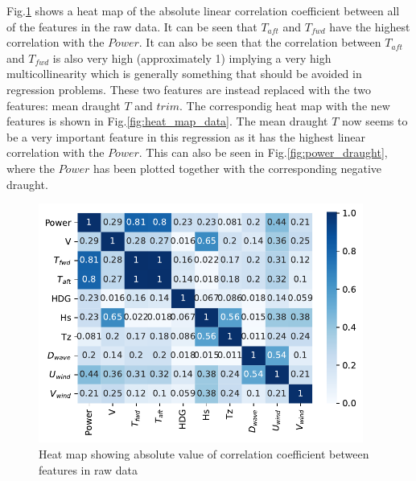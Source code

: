 Fig.\ref{fig:heat_map_raw_data} shows a heat map of the absolute
linear correlation coefficient between all of the features in the raw
data. It can be seen that $T_{aft}$ and $T_{fwd}$ have the highest
correlation with the $Power$. It can also be seen that the correlation
between $T_{aft}$ and $T_{fwd}$ is also very high (approximately 1)
implying a very high multicollinearity which is generally something that
should be avoided in regression problems. These two features are instead
replaced with the two features: mean draught $T$ and $trim$. The
correspondig heat map with the new features is shown in
Fig.\ref{fig:heat_map_data}. The mean draught $T$ now seems to
be a very important feature in this regression as it has the highest
linear correlation with the $Power$. This can also be seen in
Fig.\ref{fig:power_draught}, where the $Power$ has been
plotted together with the corresponding negative draught.
\begin{figure}[H]
\begin{center}\includegraphics[width = 0.95\textwidth]{figures/heat_map_raw_data.pdf}\end{center}
\vspace{-0.7cm}
\caption{Heat map showing absolute value of correlation coefficient between features in raw data}
\label{fig:heat_map_raw_data}
\end{figure}
